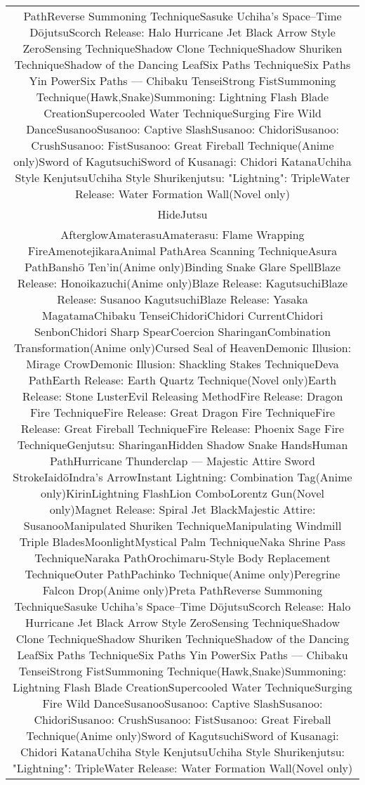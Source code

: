 \documentclass[a4paper,12pt]{article}
\begin{document}
\begin{tabular}{|c|}
PathReverse Summoning TechniqueSasuke Uchiha's Space–Time DōjutsuScorch Release: Halo Hurricane Jet Black Arrow Style ZeroSensing TechniqueShadow Clone TechniqueShadow Shuriken TechniqueShadow of the Dancing LeafSix Paths TechniqueSix Paths Yin PowerSix Paths — Chibaku TenseiStrong FistSummoning Technique(Hawk,Snake)Summoning: Lightning Flash Blade CreationSupercooled Water TechniqueSurging Fire Wild DanceSusanooSusanoo: Captive SlashSusanoo: ChidoriSusanoo: CrushSusanoo: FistSusanoo: Great Fireball Technique(Anime only)Sword of KagutsuchiSword of Kusanagi: Chidori KatanaUchiha Style KenjutsuUchiha Style Shurikenjutsu: "Lightning": TripleWater Release: Water Formation Wall(Novel only) \\
HideJutsu \\
AfterglowAmaterasuAmaterasu: Flame Wrapping FireAmenotejikaraAnimal PathArea Scanning TechniqueAsura PathBanshō Ten'in(Anime only)Binding Snake Glare SpellBlaze Release: Honoikazuchi(Anime only)Blaze Release: KagutsuchiBlaze Release: Susanoo KagutsuchiBlaze Release: Yasaka MagatamaChibaku TenseiChidoriChidori CurrentChidori SenbonChidori Sharp SpearCoercion SharinganCombination Transformation(Anime only)Cursed Seal of HeavenDemonic Illusion: Mirage CrowDemonic Illusion: Shackling Stakes TechniqueDeva PathEarth Release: Earth Quartz Technique(Novel only)Earth Release: Stone LusterEvil Releasing MethodFire Release: Dragon Fire TechniqueFire Release: Great Dragon Fire TechniqueFire Release: Great Fireball TechniqueFire Release: Phoenix Sage Fire TechniqueGenjutsu: SharinganHidden Shadow Snake HandsHuman PathHurricane Thunderclap — Majestic Attire Sword StrokeIaidōIndra's ArrowInstant Lightning: Combination Tag(Anime only)KirinLightning FlashLion ComboLorentz Gun(Novel only)Magnet Release: Spiral Jet BlackMajestic Attire: SusanooManipulated Shuriken TechniqueManipulating Windmill Triple BladesMoonlightMystical Palm TechniqueNaka Shrine Pass TechniqueNaraka PathOrochimaru-Style Body Replacement TechniqueOuter PathPachinko Technique(Anime only)Peregrine Falcon Drop(Anime only)Preta PathReverse Summoning TechniqueSasuke Uchiha's Space–Time DōjutsuScorch Release: Halo Hurricane Jet Black Arrow Style ZeroSensing TechniqueShadow Clone TechniqueShadow Shuriken TechniqueShadow of the Dancing LeafSix Paths TechniqueSix Paths Yin PowerSix Paths — Chibaku TenseiStrong FistSummoning Technique(Hawk,Snake)Summoning: Lightning Flash Blade CreationSupercooled Water TechniqueSurging Fire Wild DanceSusanooSusanoo: Captive SlashSusanoo: ChidoriSusanoo: CrushSusanoo: FistSusanoo: Great Fireball Technique(Anime only)Sword of KagutsuchiSword of Kusanagi: Chidori KatanaUchiha Style KenjutsuUchiha Style Shurikenjutsu: "Lightning": TripleWater Release: Water Formation Wall(Novel only) \\

\end{tabular}
\end{document}
